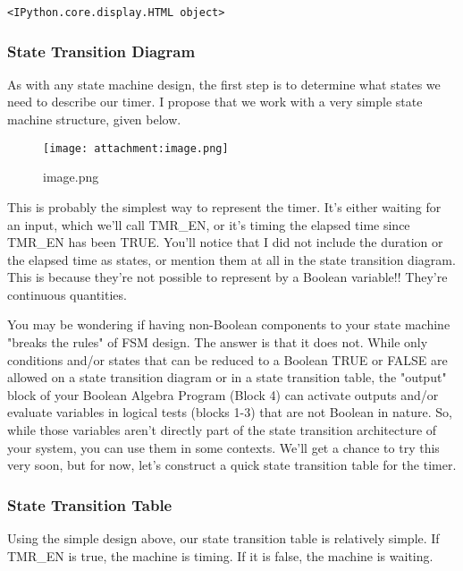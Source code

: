\documentclass[11pt]{article}
\makeatletter
\def\maxwidth{\ifdim\Gin@nat@width>\linewidth\linewidth
    \else\Gin@nat@width\fi}
\let\Oldincludegraphics\includegraphics
\renewcommand{\includegraphics}[1]{\Oldincludegraphics[width=.8\maxwidth]{#1}}
\makeatother
\begin{document}
    
    \begin{verbatim}
<IPython.core.display.HTML object>
    \end{verbatim}

    
    \subsubsection{State Transition Diagram}\label{state-transition-diagram}

As with any state machine design, the first step is to determine what
states we need to describe our timer. I propose that we work with a very
simple state machine structure, given below.

    \begin{figure}
\centering
\texttt{[image: attachment:image.png]}
\caption{image.png}
\end{figure}

    This is probably the simplest way to represent the timer. It's either
waiting for an input, which we'll call TMR\_EN, or it's timing the
elapsed time since TMR\_EN has been TRUE. You'll notice that I did not
include the duration or the elapsed time as states, or mention them at
all in the state transition diagram. This is because they're not
possible to represent by a Boolean variable!! They're continuous
quantities.

You may be wondering if having non-Boolean components to your state
machine "breaks the rules" of FSM design. The answer is that it does
not. While only conditions and/or states that can be reduced to a
Boolean TRUE or FALSE are allowed on a state transition diagram or in a
state transition table, the "output" block of your Boolean Algebra
Program (Block 4) can activate outputs and/or evaluate variables in
logical tests (blocks 1-3) that are not Boolean in nature. So, while
those variables aren't directly part of the state transition
architecture of your system, you can use them in some contexts. We'll
get a chance to try this very soon, but for now, let's construct a quick
state transition table for the timer.

    \subsubsection{State Transition Table}\label{state-transition-table}

Using the simple design above, our state transition table is relatively
simple. If TMR\_EN is true, the machine is timing. If it is false, the
machine is waiting.
\end{document}
